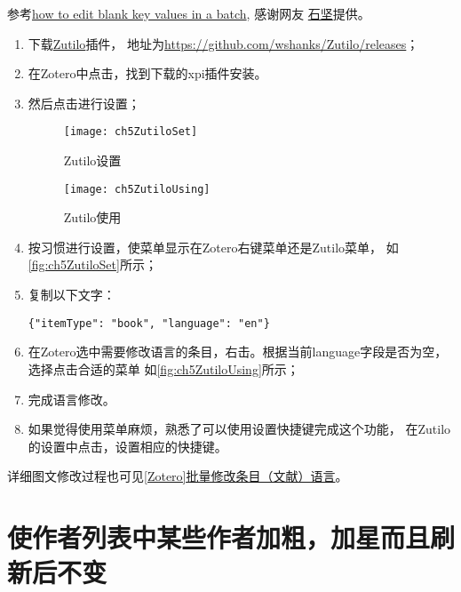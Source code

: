 \documentclass[cn,11pt,chinese]{elegantbook}
\begin{document}
\begin{enumerate}
						参考\href{https://forums.zotero.org/discussion/86911/how-to-edit-blank-key-values-in-a-batch#latest}
						{how to edit blank key values in a batch},
						感谢网友 \href{https://www.zhihu.com/people/you-hao-zhai-jian-bu-zhai}{石坚}提供。
					\begin{enumerate}[(1)]
					    \item 下载\href{https://github.com/wshanks/Zutilo/releases}{Zutilo}插件，
						地址为\href{https://github.com/wshanks/Zutilo/releases}
						{https://github.com/wshanks/Zutilo/releases}；
						\item 在Zotero中点击，找到下载的xpi插件安装。
						\item 然后点击进行设置；
						
							\begin{figure}[htbp]
								\centering
								\texttt{[image: ch5ZutiloSet]}
								\caption{Zutilo设置}
								\label{fig:ch5ZutiloSet}
							\end{figure}
							\begin{figure}[htbp]
								\centering
								\texttt{[image: ch5ZutiloUsing]}
								\caption{Zutilo使用}
								\label{fig:ch5ZutiloUsing}
							\end{figure}
						\item 按习惯进行设置，使菜单显示在Zotero右键菜单还是Zutilo菜单，
							如\autoref{fig:ch5ZutiloSet}所示；
						\item 复制以下文字：

						\verb|{"itemType": "book", "language": "en"}|

						\item 在Zotero选中需要修改语言的条目，右击。根据当前language字段是否为空，选择点击合适的菜单
							如\autoref{fig:ch5ZutiloUsing}所示；
						\item 完成语言修改。

						\item 如果觉得使用菜单麻烦，熟悉了可以使用设置快捷键完成这个功能，
						在Zutilo的设置中点击，设置相应的快捷键。
				  \end{enumerate}
		\end{enumerate}
		详细图文修改过程也可见\href{https://zhuanlan.zhihu.com/p/341989158}{[Zotero]批量修改条目（文献）语言}。
	
		\section{使作者列表中某些作者加粗，加星而且刷新后不变}\label{sec:authorBold}
\end{document}
